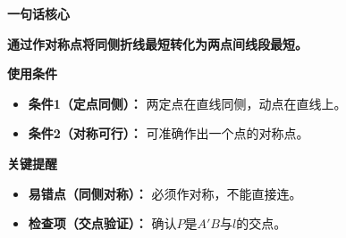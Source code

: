 \begin{summarybox}
	\textbf{\textcolor{CSummary}{一句话核心}}

	\textbf{通过作对称点将同侧折线最短转化为两点间线段最短。}

	\medskip
	\textbf{\textcolor{CSummary}{使用条件}}
	\begin{itemize}[leftmargin=*, itemsep=0.5em, topsep=0.4em]
		\item \textbf{条件1（定点同侧）：} 两定点在直线同侧，动点在直线上。
		\item \textbf{条件2（对称可行）：} 可准确作出一个点的对称点。
	\end{itemize}

	\medskip
	\textbf{\textcolor{CSummary}{关键提醒}}
	\begin{itemize}[leftmargin=*, itemsep=0.5em, topsep=0.4em]
		\item \textbf{易错点（同侧对称）：} 必须作对称，不能直接连。
		\item \textbf{检查项（交点验证）：} 确认$P$是$A'B$与$l$的交点。
	\end{itemize}
\end{summarybox}
